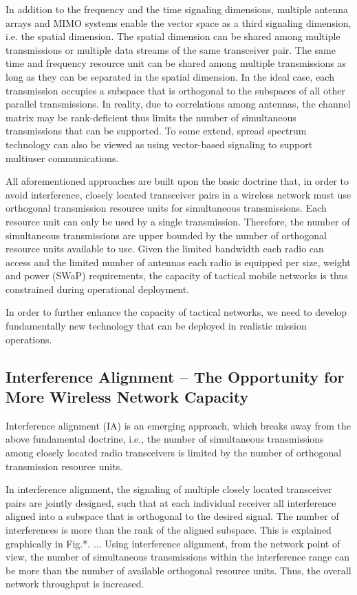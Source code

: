 \documentclass[letterpaper,11pt]{article}
\begin{document}
In addition to the frequency and the time signaling dimensions, multiple antenna arrays and MIMO systems enable the vector space as a third signaling dimension, i.e. the spatial dimension. The spatial dimension can be shared among multiple transmissions or multiple data streams of the same transceiver pair. The same time and frequency resource unit can be shared among multiple transmissions as long as they can be separated in the spatial dimension. In the ideal case, each transmission occupies a subspace that is orthogonal to the subspaces of all other parallel transmissions. In reality, due to correlations among antennas, the channel matrix may be rank-deficient thus limits the number of simultaneous transmissions that can be supported. To some extend, spread spectrum technology can also be viewed as using vector-based signaling to support multiuser communications. 

All aforementioned approaches are built upon the basic doctrine that, in order to avoid interference, closely located transceiver pairs in a wireless network must use orthogonal transmission resource units for simultaneous transmissions. Each resource unit can only be used by a single transmission. Therefore, the number of simultaneous transmissions are upper bounded by the number of orthogonal resource units available to use. Given the limited bandwidth each radio can access and the limited number of antennas each radio is equipped per size, weight and power (SWaP) requirements, the capacity of tactical mobile networks is thus constrained during operational deployment. 

In order to further enhance the capacity of tactical networks, we need to develop fundamentally new technology that can be deployed in realistic mission operations. 

\subsection{Interference Alignment -- The Opportunity for More Wireless Network Capacity}

Interference alignment (IA) is an emerging approach, which breaks away from the above fundamental doctrine, i.e., the number of simultaneous transmissions among closely located radio transceivers is limited by the number of orthogonal transmission resource units.  

 In interference alignment, the signaling of multiple closely located transceiver pairs are jointly designed, such that at each individual receiver all interference aligned into a subspace that is orthogonal to the desired signal. The number of interferences is more than the rank of the aligned subspace. This is explained graphically in Fig.*. ... Using interference alignment, from the network point of view, the number of simultaneous transmissions within the interference range can be more than the number of available orthogonal resource units. Thus, the overall network throughput is increased.
\end{document}
